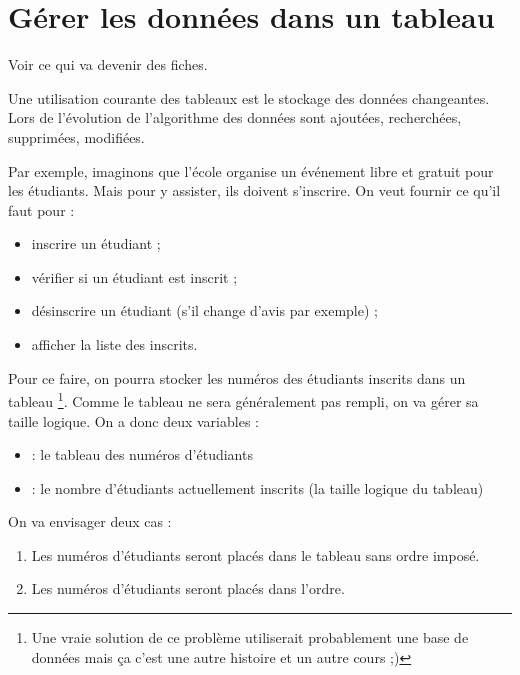 \chapter{Gérer les données dans un tableau}

	\begin{TODO}
		Voir ce qui va devenir des fiches.
	\end{TODO}
	
	Une utilisation courante des tableaux
	est le stockage des données changeantes.
	Lors de l'évolution de l'algorithme
	des données sont ajoutées, recherchées, supprimées, modifiées.
	
	Par exemple, imaginons que l'école 
	organise un événement libre et gratuit pour les étudiants.
	Mais pour y assister, ils doivent s'inscrire.
	On veut fournir ce qu'il faut pour :
	\begin{itemize}
	\item inscrire un étudiant ;
	\item vérifier si un étudiant est inscrit ;
	\item désinscrire un étudiant (s'il change d'avis par exemple) ;
	\item afficher la liste des inscrits.
	\end{itemize}

	Pour ce faire,
	on pourra stocker les numéros des étudiants inscrits
	dans un tableau%
	\footnote{%
		Une vraie solution de ce problème
		utiliserait probablement une base de données
		mais ça c'est une autre histoire et un autre cours ;)
	}.
	Comme le tableau ne sera généralement pas rempli,
	on va gérer sa taille logique.
	On a donc deux variables :
	\begin{itemize}
	\item {} : le tableau des numéros d'étudiants
	\item {} : le nombre d'étudiants actuellement inscrits (la taille logique du tableau)
	\end{itemize}
	
	On va envisager deux cas :
	\begin{enumerate}
	\item
		Les numéros d'étudiants seront placés dans le tableau sans ordre imposé.
	\item
		Les numéros d'étudiants seront placés dans l'ordre.		
	\end{enumerate}
	
